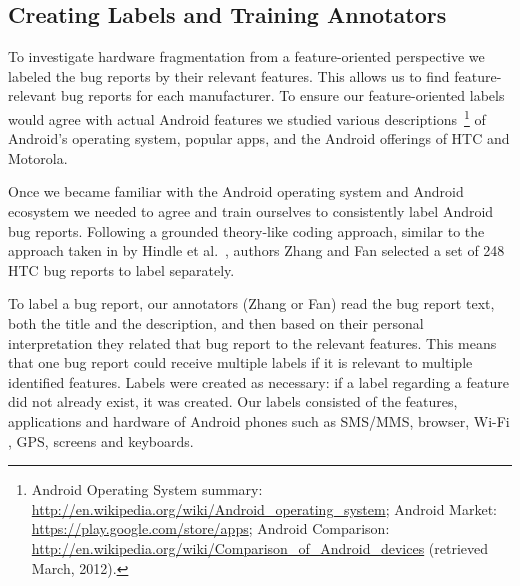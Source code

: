 \documentclass[10pt, conference, compsocconf]{IEEEtran}
\begin{document}
\subsection{Creating Labels and Training Annotators}


To investigate hardware fragmentation from a feature-oriented
perspective we labeled the bug reports by their
relevant features. This allows us to find feature-relevant bug reports
for each manufacturer.
To ensure our feature-oriented labels would agree with actual
Android features we studied various descriptions~\footnote{Android Operating System summary:
\url{http://en.wikipedia.org/wiki/Android_operating_system};
Android Market: \url{https://play.google.com/store/apps};
Android Comparison:
\url{http://en.wikipedia.org/wiki/Comparison_of_Android_devices}
(retrieved March, 2012).}
 of Android's
operating system, popular apps, and the Android offerings of HTC and
Motorola.





Once we became familiar with the Android operating system and Android
ecosystem we needed to agree and train ourselves to consistently label
Android bug reports.
Following a grounded theory-like coding approach, similar to the
approach taken in by Hindle et al.~\cite{Hindle2011}, authors Zhang
and Fan selected a set of 248 HTC bug reports to label
separately. 

To label a bug report, our annotators (Zhang or Fan) read the bug
report text, both the title and the description, and  then based on their
personal interpretation they related that bug report to the relevant
features. This means that one bug report could receive multiple labels
if it is relevant to multiple identified features. Labels were created
as necessary: if a label regarding a feature did not already exist, it
was created.
Our labels 
consisted of the features, applications and hardware of Android phones
such as SMS/MMS, browser, Wi-Fi , GPS, screens and
keyboards.
\end{document}
